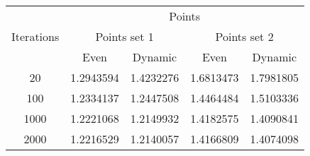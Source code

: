 \begin{center}
	\begin{tabular}{|c|c|c|c|c|}
		\hline
		\multirow{3}{*}{Iterations}	&	\multicolumn{4}{c|}{Points}	\\
										\cline{2-5}
									&	\multicolumn{2}{c|}{Points set 1}	& \multicolumn{2}{c|}{Points set 2} \\
										\cline{2-5}
									&	Even			&	Dynamic			&	Even			&	Dynamic		\\
		\hline								
		20							& 1.2943594 \cellcolor[gray]{0.9}		& 1.4232276			& 1.6813473 \cellcolor[gray]{0.9}		& 1.7981805		\\
		\hline
		100							& 1.2334137 \cellcolor[gray]{0.9}		& 1.2447508 		& 1.4464484 \cellcolor[gray]{0.9}		& 1.5103336		\\
		\hline
		1000						& 1.2221068 		& 1.2149932 \cellcolor[gray]{0.9}		& 1.4182575 		& 1.4090841	\cellcolor[gray]{0.9}	\\
		\hline
		2000						& 1.2216529 		& 1.2140057 \cellcolor[gray]{0.9}		& 1.4166809 		& 1.4074098	\cellcolor[gray]{0.9}	\\
		\hline
	\end{tabular}
	\label{tab:selection_type}
\end{center}
